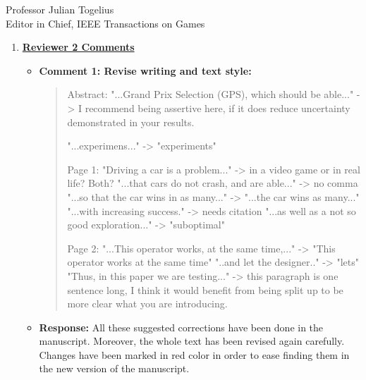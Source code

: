 \documentclass[10pt]{letter} %
\begin{document}
\begin{letter}{Professor Julian Togelius \\ Editor in Chief, IEEE Transactions on Games}
\begin{enumerate}
\item {\bf \underline{ Reviewer 2 Comments}}\\
	\begin{itemize}
		\item {\bf  Comment 1:  Revise writing and text style:\\
		\begin{quote}
			Abstract:
			"...Grand Prix Selection (GPS), which should be able..." -> I recommend 
			being assertive here, if it does reduce uncertainty demonstrated in 
			your results.

			"...experimens..." -> "experiments"
			
			Page 1:
			"Driving a car is a problem..." -> in a video game or in real life? 
			Both?
			"...that cars do not crash, and are able..." -> no comma
			"...so that the car wins in as many..." -> "...the car wins as many..."
			"...with increasing success." -> needs citation
			"...as well as a not so good exploration..." -> "suboptimal"

			Page 2:
			"...This operator works, at the same time,..." -> "This operator works 
			at the same time"
			"..and let the designer.." -> "lets"
			"Thus, in this paper we are testing..." -> this paragraph is one 		
			sentence long, I think it would benefit from being split up to be more 
			clear what you are introducing.
			\end{quote}}
			\item {\bf Response:} All these suggested corrections have been done in 	
 			the manuscript. Moreover, the whole text has been revised 
			again carefully. Changes have been marked in red color in order to ease 
			finding them in the new version of the manuscript. 



\end{itemize}
\end{enumerate}
\end{letter}
\end{document}
